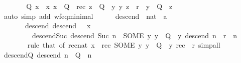 \begin{isabellebody}
\ \ \ \ \isamarkupfalse%
\ \isamarkupfalse%
\ Q\ x\ \ x{\isacharcolon}{\kern0pt}\ {\isachardoublequoteopen}x\ {\isasymin}\ Q{\isachardoublequoteclose}\ \ rec{\isacharcolon}{\kern0pt}\ {\isachardoublequoteopen}z\ {\isasymin}\ Q\ {\isasymLongrightarrow}\ {\isasymexists}y{\isachardot}{\kern0pt}\ {\isacharparenleft}{\kern0pt}y{\isacharcomma}{\kern0pt}\ z{\isacharparenright}{\kern0pt}\ {\isasymin}\ r\ {\isasymand}\ y\ {\isasymin}\ Q{\isachardoublequoteclose}\ \ z\isanewline
\ \ \ \ \ \ \isamarkupfalse%
\ {\isacharparenleft}{\kern0pt}auto\ simp\ add{\isacharcolon}{\kern0pt}\ wf{\isacharunderscore}{\kern0pt}eq{\isacharunderscore}{\kern0pt}minimal{\isacharparenright}{\kern0pt}\isanewline
\ \ \ \ \isamarkupfalse%
\ descend\ {\isacharcolon}{\kern0pt}{\isacharcolon}{\kern0pt}\ {\isachardoublequoteopen}nat\ {\isasymRightarrow}\ {\isacharprime}{\kern0pt}a{\isachardoublequoteclose}\isanewline
\ \ \ \ \ \ \ descend{\isacharunderscore}{\kern0pt}{}{\isacharcolon}{\kern0pt}\ {\isachardoublequoteopen}descend\ {}\ {\isacharequal}{\kern0pt}\ x{\isachardoublequoteclose}\isanewline
\ \ \ \ \ \ \ \ \ descend{\isacharunderscore}{\kern0pt}Suc{\isacharcolon}{\kern0pt}\ {\isachardoublequoteopen}descend\ {\isacharparenleft}{\kern0pt}Suc\ n{\isacharparenright}{\kern0pt}\ {\isacharequal}{\kern0pt}\ {\isacharparenleft}{\kern0pt}SOME\ y{\isachardot}{\kern0pt}\ y\ {\isasymin}\ Q\ {\isasymand}\ {\isacharparenleft}{\kern0pt}y{\isacharcomma}{\kern0pt}\ descend\ n{\isacharparenright}{\kern0pt}\ {\isasymin}\ r{\isacharparenright}{\kern0pt}{\isachardoublequoteclose}\ \ n\isanewline
\ \ \ \ \ \ \isamarkupfalse%
\ {\isacharparenleft}{\kern0pt}rule\ that\ {\isacharbrackleft}{\kern0pt}of\ {\isachardoublequoteopen}rec{\isacharunderscore}{\kern0pt}nat\ x\ {\isacharparenleft}{\kern0pt}{\isasymlambda}{\isacharunderscore}{\kern0pt}\ rec{\isachardot}{\kern0pt}\ {\isacharparenleft}{\kern0pt}SOME\ y{\isachardot}{\kern0pt}\ y\ {\isasymin}\ Q\ {\isasymand}\ {\isacharparenleft}{\kern0pt}y{\isacharcomma}{\kern0pt}\ rec{\isacharparenright}{\kern0pt}\ {\isasymin}\ r{\isacharparenright}{\kern0pt}{\isacharparenright}{\kern0pt}{\isachardoublequoteclose}{\isacharbrackright}{\kern0pt}{\isacharparenright}{\kern0pt}\ simp{\isacharunderscore}{\kern0pt}all\isanewline
\ \ \ \ \isamarkupfalse%
\ descend{\isacharunderscore}{\kern0pt}Q{\isacharcolon}{\kern0pt}\ {\isachardoublequoteopen}descend\ n\ {\isasymin}\ Q{\isachardoublequoteclose}\ \ n\isanewline

\end{isabellebody}
